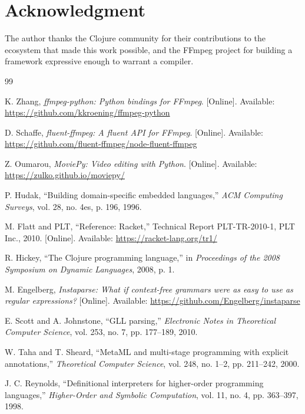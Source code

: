 \documentclass[conference]{IEEEtran}
\begin{document}
\section*{Acknowledgment}

The author thanks the Clojure community for their contributions to the ecosystem that made this work possible, and the FFmpeg project for building a framework expressive enough to warrant a compiler.




\begin{thebibliography}{99}

K. Zhang, \emph{ffmpeg-python: Python bindings for FFmpeg}.
[Online]. Available: \url{https://github.com/kkroening/ffmpeg-python}

D. Schaffe, \emph{fluent-ffmpeg: A fluent API for FFmpeg}.
[Online]. Available: \url{https://github.com/fluent-ffmpeg/node-fluent-ffmpeg}

Z. Oumarou, \emph{MoviePy: Video editing with Python}.
[Online]. Available: \url{https://zulko.github.io/moviepy/}

P. Hudak, ``Building domain-specific embedded languages,''
\emph{ACM Computing Surveys}, vol. 28, no. 4es, p. 196, 1996.

M. Flatt and PLT, ``Reference: Racket,''
Technical Report PLT-TR-2010-1, PLT Inc., 2010.
[Online]. Available: \url{https://racket-lang.org/tr1/}

R. Hickey, ``The Clojure programming language,''
in \emph{Proceedings of the 2008 Symposium on Dynamic Languages}, 2008, p. 1.

M. Engelberg, \emph{Instaparse: What if context-free grammars were as easy to use as regular expressions?}
[Online]. Available: \url{https://github.com/Engelberg/instaparse}

E. Scott and A. Johnstone, ``GLL parsing,''
\emph{Electronic Notes in Theoretical Computer Science},
vol. 253, no. 7, pp. 177--189, 2010.

W. Taha and T. Sheard, ``MetaML and multi-stage programming with explicit annotations,''
\emph{Theoretical Computer Science}, vol. 248, no. 1--2, pp. 211--242, 2000.

J. C. Reynolds, ``Definitional interpreters for higher-order programming languages,''
\emph{Higher-Order and Symbolic Computation}, vol. 11, no. 4, pp. 363--397, 1998.


\end{thebibliography}
\end{document}
